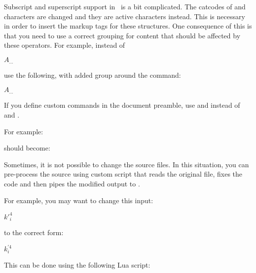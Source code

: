 
Subscript and superscript support in \texfourht\ is a bit complicated. The
catcodes of \texcommand{_} and \texcommand{^} characters are changed and they are
active characters instead. This is necessary in order to insert the markup tags
for these structures. One consequence of this is that you need to use a correct grouping
for content that should be affected by these operators.
For example, instead of 

\begin{texsource}
$A_\mathit{...}$
\end{texsource}

use the following, with added group around the \texcommand{\mathit} command:

\begin{texsource}
$A_{\mathit{...}}$
\end{texsource}

If you define custom commands in the document preamble, use \texcommand{\sp}
and \texcommand{\sb} instead of \texcommand{^} and \texcommand{_}.

For example:

\begin{texsource}
\newcommand \coeffX [4][X]{\mathbf{#1}_{{#2},{#3}}(#4)}
\end{texsource}

should become:

\begin{texsource}
\newcommand\coeffX [4][X]{{\mathbf{#1}}\sb{#2,#3}(#4)}
\end{texsource}

Sometimes, it is not possible to change the source files. In this situation, you 
can pre-process the source using custom script that reads the original file, fixes the code
and then pipes the modified output to .

For example, you may want to change this input:

\begin{texsource}
$k'^4_{i}$
\end{texsource}

to the correct form:

\begin{texsource}
$k^{\prime 4}_{i}$
\end{texsource}

This can be done using the following Lua script:

